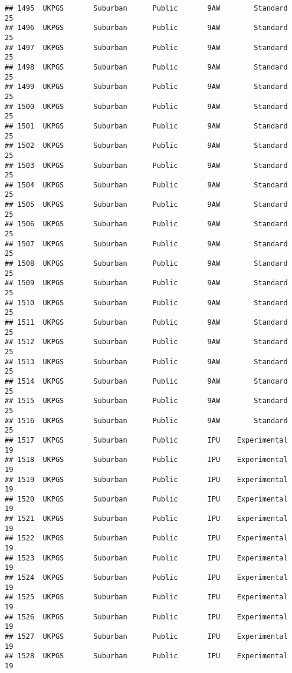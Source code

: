 \documentclass[
]{article}
\begin{document}
\begin{verbatim}
## 1495  UKPGS       Suburban      Public       9AW        Standard        25
## 1496  UKPGS       Suburban      Public       9AW        Standard        25
## 1497  UKPGS       Suburban      Public       9AW        Standard        25
## 1498  UKPGS       Suburban      Public       9AW        Standard        25
## 1499  UKPGS       Suburban      Public       9AW        Standard        25
## 1500  UKPGS       Suburban      Public       9AW        Standard        25
## 1501  UKPGS       Suburban      Public       9AW        Standard        25
## 1502  UKPGS       Suburban      Public       9AW        Standard        25
## 1503  UKPGS       Suburban      Public       9AW        Standard        25
## 1504  UKPGS       Suburban      Public       9AW        Standard        25
## 1505  UKPGS       Suburban      Public       9AW        Standard        25
## 1506  UKPGS       Suburban      Public       9AW        Standard        25
## 1507  UKPGS       Suburban      Public       9AW        Standard        25
## 1508  UKPGS       Suburban      Public       9AW        Standard        25
## 1509  UKPGS       Suburban      Public       9AW        Standard        25
## 1510  UKPGS       Suburban      Public       9AW        Standard        25
## 1511  UKPGS       Suburban      Public       9AW        Standard        25
## 1512  UKPGS       Suburban      Public       9AW        Standard        25
## 1513  UKPGS       Suburban      Public       9AW        Standard        25
## 1514  UKPGS       Suburban      Public       9AW        Standard        25
## 1515  UKPGS       Suburban      Public       9AW        Standard        25
## 1516  UKPGS       Suburban      Public       9AW        Standard        25
## 1517  UKPGS       Suburban      Public       IPU    Experimental        19
## 1518  UKPGS       Suburban      Public       IPU    Experimental        19
## 1519  UKPGS       Suburban      Public       IPU    Experimental        19
## 1520  UKPGS       Suburban      Public       IPU    Experimental        19
## 1521  UKPGS       Suburban      Public       IPU    Experimental        19
## 1522  UKPGS       Suburban      Public       IPU    Experimental        19
## 1523  UKPGS       Suburban      Public       IPU    Experimental        19
## 1524  UKPGS       Suburban      Public       IPU    Experimental        19
## 1525  UKPGS       Suburban      Public       IPU    Experimental        19
## 1526  UKPGS       Suburban      Public       IPU    Experimental        19
## 1527  UKPGS       Suburban      Public       IPU    Experimental        19
## 1528  UKPGS       Suburban      Public       IPU    Experimental        19

\end{verbatim}
\end{document}
